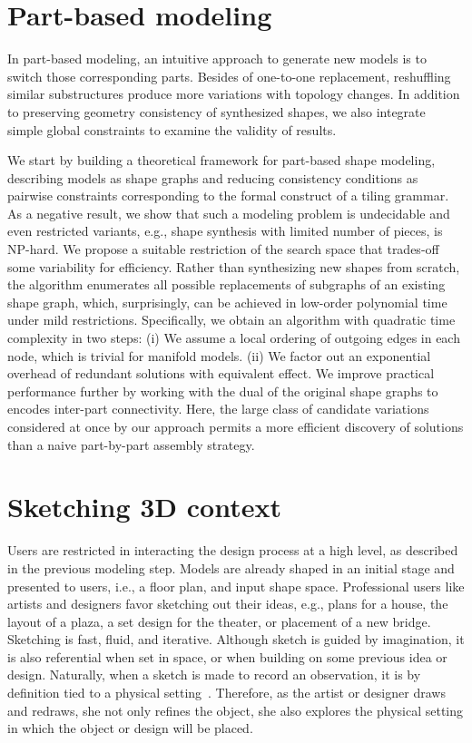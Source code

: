 \section{Part-based modeling}

In part-based modeling, an intuitive approach to generate new models is to switch those corresponding parts. Besides of one-to-one replacement, reshuffling similar substructures produce more variations with topology changes. In addition to preserving geometry consistency of synthesized shapes, we also integrate simple global constraints to examine the validity of results.

We start by building a theoretical framework for part-based shape modeling, describing models as shape graphs and reducing consistency conditions as pairwise constraints corresponding to the formal construct of a tiling grammar. As a negative result, we show that such a modeling problem is undecidable and even restricted variants, e.g., shape synthesis with limited number of pieces, is NP-hard. We propose a suitable restriction of the search space that trades-off some variability for efficiency. Rather than synthesizing new shapes from scratch, the algorithm enumerates all possible replacements of subgraphs of an existing shape graph, which, surprisingly, can be achieved in low-order polynomial time under mild restrictions. Specifically, we obtain an algorithm with quadratic time complexity in two steps: (i) We assume a local ordering of outgoing edges in each node, which is trivial for manifold models. (ii) We factor out an exponential overhead of redundant solutions with equivalent effect. We improve practical performance further by working with the dual of the original shape graphs to encodes inter-part connectivity. Here, the large class of candidate variations considered at once by our approach permits a more efficient discovery of solutions than a naive part-by-part assembly strategy.

\section{Sketching 3D context}

Users are restricted in interacting the design process at a high level, as described in the previous modeling step. Models are already shaped in an initial stage and presented to users, i.e., a floor plan, and input shape space. Professional users like artists and designers favor sketching out their ideas, e.g., plans for a house, the layout of a plaza, a set design for the theater, or placement of a new bridge. Sketching is fast, fluid, and iterative. Although sketch is guided by imagination, it is also referential when set in space, or when building on some previous idea or design. Naturally, when a sketch is made to record an observation, it is by definition tied to a physical setting~\cite{NecessityDrawing77}. Therefore, as the artist or designer draws and redraws, she not only refines the object, she also explores the physical setting in which the object or design will be placed.

